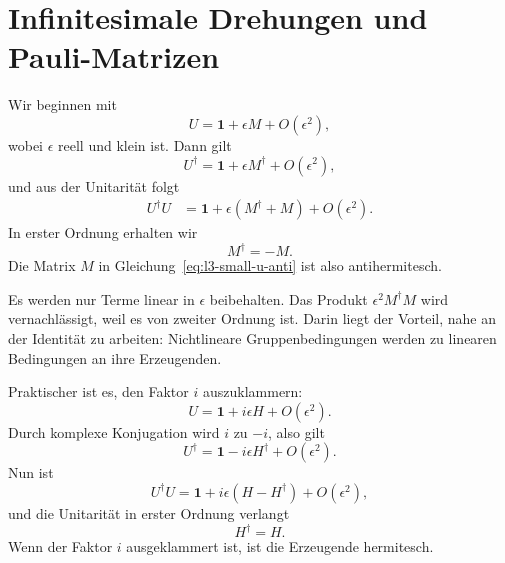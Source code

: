 \section{Infinitesimale Drehungen und Pauli-Matrizen}

\begin{classroomqa}\end{classroomqa}

Wir beginnen mit
\begin{equation}
U=\boldsymbol 1+\epsilon M+O(\epsilon^2),
\label{eq:l3-small-u-anti}
\end{equation}
wobei \(\epsilon\) reell und klein ist. Dann gilt
\begin{equation}
U^\dagger=\boldsymbol 1+\epsilon M^\dagger+O(\epsilon^2),
\end{equation}
und aus der Unitarität folgt
\begin{align}
U^\dagger U
 &=\boldsymbol 1+\epsilon(M^\dagger+M)+O(\epsilon^2).
\end{align}
In erster Ordnung erhalten wir
\begin{equation}
M^\dagger=-M.
\end{equation}
Die Matrix \(M\) in Gleichung~\eqref{eq:l3-small-u-anti} ist also antihermitesch.

Es werden nur Terme linear in \(\epsilon\) beibehalten. Das Produkt \(\epsilon^2M^\dagger M\) wird vernachlässigt, weil es von zweiter Ordnung ist. Darin liegt der Vorteil, nahe an der Identität zu arbeiten: Nichtlineare Gruppenbedingungen werden zu linearen Bedingungen an ihre Erzeugenden.

Praktischer ist es, den Faktor \(i\) auszuklammern:
\begin{equation}
U=\boldsymbol 1+i\epsilon H+O(\epsilon^2).
\label{eq:l3-small-u-herm}
\end{equation}
Durch komplexe Konjugation wird \(i\) zu \(-i\), also gilt
\begin{equation}
U^\dagger=\boldsymbol 1-i\epsilon H^\dagger+O(\epsilon^2).
\end{equation}
Nun ist
\begin{equation}
U^\dagger U
=\boldsymbol 1+i\epsilon(H-H^\dagger)+O(\epsilon^2),
\end{equation}
und die Unitarität in erster Ordnung verlangt
\begin{equation}
H^\dagger=H.
\end{equation}
Wenn der Faktor \(i\) ausgeklammert ist, ist die Erzeugende hermitesch.


